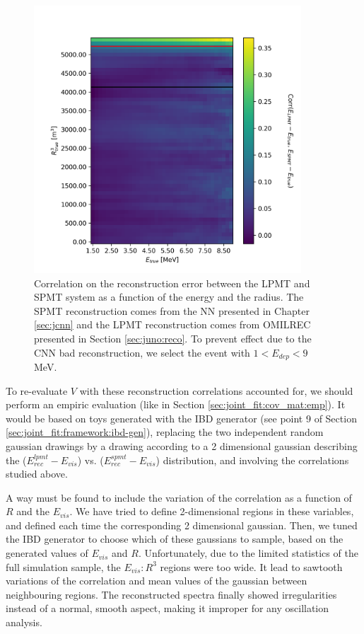 \documentclass[../main.tex]{subfiles}
\begin{document}
\begin{figure}[ht]
  \centering
  \includegraphics[height=10cm]{images/joint_fit/E_R_corr.png}
  \caption{Correlation on the reconstruction error between the LPMT and SPMT system as a function of  the energy and the radius. The SPMT reconstruction comes from the NN presented in Chapter \ref{sec:jcnn} and the LPMT reconstruction comes from OMILREC presented in Section \ref{sec:juno:reco}. To prevent effect due to the CNN bad reconstruction, we select the event with $1 < E_{dep} < 9$ MeV.}
  \label{fig:joint_fit:empirical_corr:E_R}
\end{figure}

To re-evaluate $V$ with these reconstruction correlations accounted for, we should perform an empiric evaluation (like in Section \ref{sec:joint_fit:cov_mat:emp}).
It would be based on toys generated with the IBD generator (see point 9 of Section \ref{sec:joint_fit:framework:ibd-gen}), replacing the two independent random gaussian drawings by a drawing according to a 2 dimensional gaussian describing the ($E^{lpmt}_{rec}-E_{vis}$) vs. ($E^{spmt}_{rec}-E_{vis}$)  distribution, and involving the correlations studied above.

A way must be found to include the variation of the correlation as a function of $R$ and the $E_{vis}$. We have tried to define 2-dimensional regions in these variables, and defined each time the corresponding 2 dimensional gaussian. Then, we tuned the IBD generator to choose which of these gaussians to sample, based on the generated values of $E_{vis}$ and $R$. Unfortunately, due to the limited statistics of the full simulation sample, the $E_{vis}:R^3$ regions were too wide. It lead to sawtooth variations of the correlation and mean values of the gaussian between neighbouring regions. The reconstructed spectra finally showed irregularities instead of a normal, smooth aspect, making it improper for any oscillation analysis.
\end{document}
